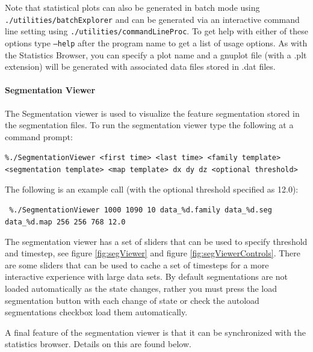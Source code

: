 Note that statistical plots can also be generated in batch mode using
\texttt{./utilities/batchExplorer} and can be generated via an interactive
command line setting using \texttt{./utilities/commandLineProc}. To get help with
either of these options type \texttt{--help} after the program name to get a list of usage
options.  As with the Statistics Browser, you can specify a plot name and a gnuplot 
file (with a .plt extension) will be generated with associated data files stored in 
.dat files.  

\paragraph{Segmentation Viewer} 
The Segmentation viewer is used to visualize the feature segmentation stored in the segmentation files.
To run the segmentation viewer type the following at a command prompt:

{\footnotesize
\texttt{\%./SegmentationViewer <first time> <last time> <family template> <segmentation template> <map template> dx dy dz <optional threshold>}
}


The following is an example call (with the optional threshold specified as 12.0):

{\footnotesize \texttt{
\%./SegmentationViewer 1000 1090 10 data\_\%d.family data\_\%d.seg data\_\%d.map 256 256 768 12.0
  }}

The segmentation viewer has a set of sliders that can be used to specify threshold and timestep, see figure 
\ref{fig:segViewer} and figure \ref{fig:segViewerControls}.  There are some sliders that can be used to cache a set of timesteps for a more interactive 
experience with large data sets. By default segmentations are not loaded automatically as the state changes, rather
you must press the load segmentation button with each change of state or check the autoload segmentations checkbox
load them automatically.  

A final feature of the segmentation viewer is that it can be synchronized with the statistics browser.  Details on
this are found below.

